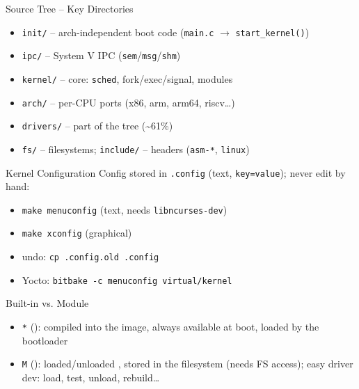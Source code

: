 \begin{definition}{Source Tree -- Key Directories}
    \begin{itemize}
        \item \texttt{init/} -- arch-independent boot code (\texttt{main.c} $\to$
              \texttt{start\_kernel()})
        \item \texttt{ipc/} -- System V IPC (\texttt{sem}/\texttt{msg}/\texttt{shm})
        \item \texttt{kernel/} -- core: \texttt{sched}, fork/exec/signal, modules
        \item \texttt{arch/} -- per-CPU ports (x86, arm, arm64, riscv\dots)
        \item \texttt{drivers/} --  part of the tree (\textasciitilde61\%)
        \item \texttt{fs/} -- filesystems; \texttt{include/} -- headers (\texttt{asm-*}, \texttt{linux})
    \end{itemize}
\end{definition}

\multend


\begin{definition}{Kernel Configuration}
    Config stored in \texttt{.config} (text, \texttt{key=value}); never edit by hand:
    \begin{itemize}
        \item \texttt{make menuconfig} (text, needs \texttt{libncurses-dev})
        \item \texttt{make xconfig} (graphical)
        \item undo: \texttt{cp .config.old .config}
        \item Yocto: \texttt{bitbake -c menuconfig virtual/kernel}
    \end{itemize}
\end{definition}

\begin{definition}{Built-in vs. Module}
    \begin{itemize}
        \item \texttt{*} (): compiled into the image, always
              available at boot, loaded by the bootloader
        \item \texttt{M} (): loaded/unloaded ,
              stored in the filesystem (needs FS access); easy driver dev: load,
              test, unload, rebuild\dots
    \end{itemize}
\end{definition}

